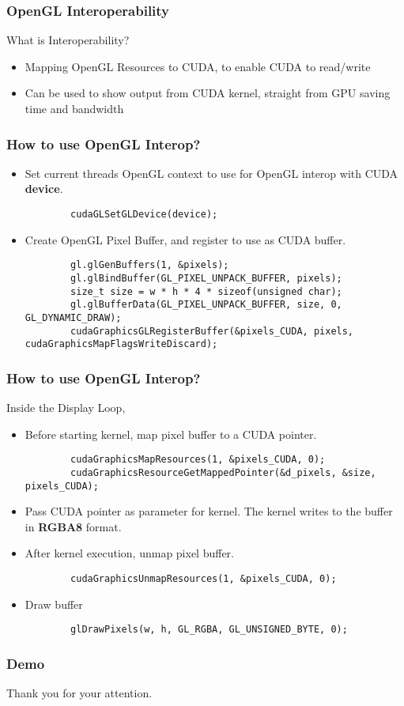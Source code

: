\documentclass{beamer}
\begin{document}
\begin{frame}
\frametitle{OpenGL Interoperability}
What is Interoperability?
\begin{itemize}
	\item Mapping OpenGL Resources to CUDA, to enable CUDA to read/write
	\item Can be used to show output from CUDA kernel, straight from GPU saving time and bandwidth
\end{itemize}
\end{frame}


\begin{frame}[fragile]
	\frametitle{How to use OpenGL Interop?}
	\begin{itemize}
		\item Set current threads OpenGL context to use for OpenGL interop with CUDA \textbf{device}.
		\begin{lstlisting}
		cudaGLSetGLDevice(device);
		\end{lstlisting}
		\item Create OpenGL Pixel Buffer, and register to use as CUDA buffer.
		\begin{lstlisting}
		gl.glGenBuffers(1, &pixels);
		gl.glBindBuffer(GL_PIXEL_UNPACK_BUFFER, pixels);
		size_t size = w * h * 4 * sizeof(unsigned char);
		gl.glBufferData(GL_PIXEL_UNPACK_BUFFER, size, 0, GL_DYNAMIC_DRAW);
		cudaGraphicsGLRegisterBuffer(&pixels_CUDA, pixels, cudaGraphicsMapFlagsWriteDiscard);
		\end{lstlisting}
	\end{itemize}
\end{frame}

\begin{frame}[fragile]
	\frametitle{How to use OpenGL Interop?}
	Inside the Display Loop,
	\begin{itemize}
		\item Before starting kernel, map pixel buffer to a CUDA pointer.
		\begin{lstlisting}
		cudaGraphicsMapResources(1, &pixels_CUDA, 0); 
		cudaGraphicsResourceGetMappedPointer(&d_pixels, &size,  pixels_CUDA);
		\end{lstlisting}
		\item Pass CUDA pointer as parameter for kernel. The kernel writes to the buffer in \textbf{RGBA8} format.
		\item After kernel execution, unmap pixel buffer.
		\begin{lstlisting}
		cudaGraphicsUnmapResources(1, &pixels_CUDA, 0);
		\end{lstlisting}
		\item Draw buffer
		\begin{lstlisting}
		glDrawPixels(w, h, GL_RGBA, GL_UNSIGNED_BYTE, 0);
		\end{lstlisting}
	\end{itemize}
\end{frame}

\begin{frame}
  \frametitle{Demo}
  \huge{\centerline{Thank you for your attention.}}
\end{frame}
\end{document}
